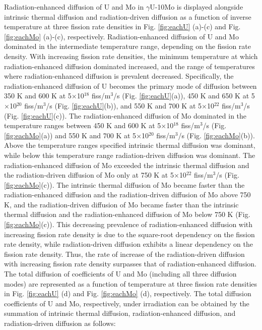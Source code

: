 \documentclass[preprint,12pt]{elsarticle}
\begin{document}
Radiation-enhanced diffusion of U and Mo in $\gamma$U-10Mo is displayed alongside intrinsic thermal diffusion and radiation-driven diffusion as a function of inverse temperature at three fission rate densities in Fig. \ref{fig:eachU} (a)-(c) and Fig. \ref{fig:eachMo} (a)-(c), respectively. Radiation-enhanced diffusion of U and Mo dominated in the intermediate temperature range, depending on the fission rate density. With increasing fission rate densities, the minimum temperature at which radiation-enhanced diffusion dominated increased, and the range of temperatures where radiation-enhanced diffusion is prevalent decreased. Specifically, the radiation-enhanced diffusion of U becomes the primary mode of diffusion between 350 K and 600 K at 5$\times$10$^{18}$ fiss/m$^{3}$/s (Fig. \ref{fig:eachU}(a)), 450 K and 650 K at 5$\times$10$^{20}$ fiss/m$^{3}$/s (Fig. \ref{fig:eachU}(b)), and 550 K and 700 K at 5$\times$10$^{22}$ fiss/m$^{3}$/s (Fig. \ref{fig:eachU}(c)). The radiation-enhanced diffusion of Mo dominated in the temperature ranges between 450 K and 600 K at 5$\times$10$^{18}$ fiss/m$^{3}$/s (Fig. \ref{fig:eachMo}(a)) and 550 K and 700 K at 5$\times$10$^{20}$ fiss/m$^{3}$/s (Fig. \ref{fig:eachMo}(b)). Above the temperature ranges specified intrinsic thermal diffusion was dominant, while below this temperature range radiation-driven diffusion was dominant. The radiation-enhanced diffusion of Mo exceeded the intrinsic thermal diffusion and the radiation-driven diffusion of Mo only at 750 K at 5$\times$10$^{22}$ fiss/m$^{3}$/s (Fig. \ref{fig:eachMo}(c)). The intrinsic thermal diffusion of Mo became faster than the radiation-enhanced diffusion and the radiation-driven diffusion of Mo above 750 K, and the radiation-driven diffusion of Mo became faster than the intrinsic thermal diffusion and the radiation-enhanced diffusion of Mo below 750 K (Fig. \ref{fig:eachMo}(c)). This decreasing prevalence of radiation-enhanced diffusion with increasing fission rate density is due to the square-root dependency on the fission rate density, while radiation-driven diffusion exhibits a linear dependency on the fission rate density. Thus, the rate of increase of the radiation-driven diffusion with increasing fission rate density surpasses that of radiation-enhanced diffusion. The total diffusion of coefficients of U and Mo (including all three diffusion modes) are represented as a function of temperature at three fission rate densities in Fig. \ref{fig:eachU} (d) and Fig. \ref{fig:eachMo} (d), respectively. The total diffusion coefficients of U and Mo, respectively, under irradiation can be obtained by the summation of intrinsic thermal diffusion, radiation-enhanced diffusion, and radiation-driven diffusion as follows: 
\end{document}
